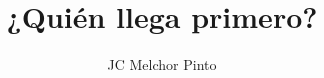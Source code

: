 \documentclass[12pt,addpoints,answers]{guia}
\title{¿Quién llega primero?}
\author{JC Melchor Pinto}
\begin{document}
\pagestyle{headandfoot}

\INFO
\printanswers
%     
%     
\begin{questions}
    \questionboxed[100]{}
\end{questions}
\end{document}
